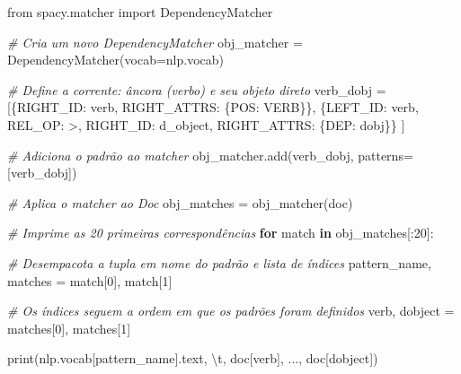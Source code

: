 \documentclass[
  brazilian,
]{article}
\newenvironment{Shaded}{}{}
\newcommand{\BuiltInTok}[1]{#1}
\newcommand{\CharTok}[1]{\textcolor[rgb]{0.25,0.44,0.63}{#1}}
\newcommand{\CommentTok}[1]{\textcolor[rgb]{0.38,0.63,0.69}{\textit{#1}}}
\newcommand{\ControlFlowTok}[1]{\textcolor[rgb]{0.00,0.44,0.13}{\textbf{#1}}}
\newcommand{\DecValTok}[1]{\textcolor[rgb]{0.25,0.63,0.44}{#1}}
\newcommand{\ImportTok}[1]{#1}
\newcommand{\KeywordTok}[1]{\textcolor[rgb]{0.00,0.44,0.13}{\textbf{#1}}}
\newcommand{\NormalTok}[1]{#1}
\newcommand{\OperatorTok}[1]{\textcolor[rgb]{0.40,0.40,0.40}{#1}}
\newcommand{\StringTok}[1]{\textcolor[rgb]{0.25,0.44,0.63}{#1}}
\begin{document}
\begin{Shaded}
\begin{Highlighting}[]
\ImportTok{from}\NormalTok{ spacy.matcher }\ImportTok{import}\NormalTok{ DependencyMatcher}

\CommentTok{\# Cria um novo DependencyMatcher}
\NormalTok{obj\_matcher }\OperatorTok{=}\NormalTok{ DependencyMatcher(vocab}\OperatorTok{=}\NormalTok{nlp.vocab)}

\CommentTok{\# Define a corrente: âncora (verbo) e seu objeto direto}
\NormalTok{verb\_dobj }\OperatorTok{=}\NormalTok{ [\{}\StringTok{\textquotesingle{}RIGHT\_ID\textquotesingle{}}\NormalTok{: }\StringTok{\textquotesingle{}verb\textquotesingle{}}\NormalTok{, }\StringTok{\textquotesingle{}RIGHT\_ATTRS\textquotesingle{}}\NormalTok{: \{}\StringTok{\textquotesingle{}POS\textquotesingle{}}\NormalTok{: }\StringTok{\textquotesingle{}VERB\textquotesingle{}}\NormalTok{\}\},}
\NormalTok{             \{}\StringTok{\textquotesingle{}LEFT\_ID\textquotesingle{}}\NormalTok{: }\StringTok{\textquotesingle{}verb\textquotesingle{}}\NormalTok{, }\StringTok{\textquotesingle{}REL\_OP\textquotesingle{}}\NormalTok{: }\StringTok{\textquotesingle{}\textgreater{}\textquotesingle{}}\NormalTok{, }\StringTok{\textquotesingle{}RIGHT\_ID\textquotesingle{}}\NormalTok{: }\StringTok{\textquotesingle{}d\_object\textquotesingle{}}\NormalTok{,}
              \StringTok{\textquotesingle{}RIGHT\_ATTRS\textquotesingle{}}\NormalTok{: \{}\StringTok{\textquotesingle{}DEP\textquotesingle{}}\NormalTok{: }\StringTok{\textquotesingle{}dobj\textquotesingle{}}\NormalTok{\}\}}
\NormalTok{            ]}

\CommentTok{\# Adiciona o padrão ao matcher}
\NormalTok{obj\_matcher.add(}\StringTok{\textquotesingle{}verb\_dobj\textquotesingle{}}\NormalTok{, patterns}\OperatorTok{=}\NormalTok{[verb\_dobj])}

\CommentTok{\# Aplica o matcher ao Doc}
\NormalTok{obj\_matches }\OperatorTok{=}\NormalTok{ obj\_matcher(doc)}

\CommentTok{\# Imprime as 20 primeiras correspondências}
\ControlFlowTok{for}\NormalTok{ match }\KeywordTok{in}\NormalTok{ obj\_matches[:}\DecValTok{20}\NormalTok{]:}

    \CommentTok{\# Desempacota a tupla em nome do padrão e lista de índices}
\NormalTok{    pattern\_name, matches }\OperatorTok{=}\NormalTok{ match[}\DecValTok{0}\NormalTok{], match[}\DecValTok{1}\NormalTok{]}

    \CommentTok{\# Os índices seguem a ordem em que os padrões foram definidos}
\NormalTok{    verb, dobject }\OperatorTok{=}\NormalTok{ matches[}\DecValTok{0}\NormalTok{], matches[}\DecValTok{1}\NormalTok{]}

    \BuiltInTok{print}\NormalTok{(nlp.vocab[pattern\_name].text, }\StringTok{\textquotesingle{}}\CharTok{\textbackslash{}t}\StringTok{\textquotesingle{}}\NormalTok{, doc[verb], }\StringTok{\textquotesingle{}...\textquotesingle{}}\NormalTok{, doc[dobject])}
\end{Highlighting}
\end{Shaded}
\end{document}
